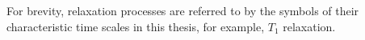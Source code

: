 For brevity, relaxation processes are referred to by the symbols of their characteristic time scales in this thesis, for example, $T_1$ relaxation.











